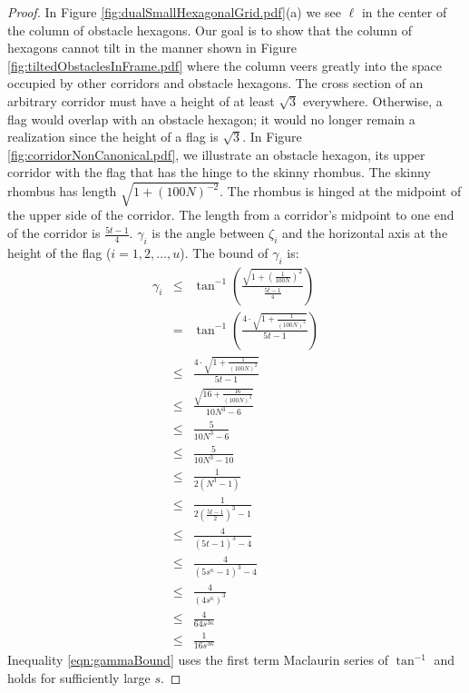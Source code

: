 \documentclass[10pt]{CSUNthesis}
\theoremstyle{plain}%
\theoremstyle{definition}
\theoremstyle{remark}
\newcommand{\lr}[1]{\left( #1 \right)}
\begin{document}
\begin{proof}
In Figure \ref{fig:dualSmallHexagonalGrid.pdf}(a) we see $\ell$ in the center of the column of obstacle hexagons.  
Our goal is to show that the column of hexagons cannot tilt in the manner shown in Figure \ref{fig:tiltedObstaclesInFrame.pdf} where the column veers greatly into the space occupied by other corridors and obstacle hexagons.
The cross section of an arbitrary corridor must have a height of at least $\sqrt{3}$ everywhere. 
Otherwise, a flag would overlap with an obstacle hexagon; it would no longer remain a realization since the height of a flag is $\sqrt{3}$.
In Figure \ref{fig:corridorNonCanonical.pdf}, we illustrate an obstacle hexagon, its upper corridor with the flag that has the hinge to the skinny rhombus.  
The skinny rhombus has length $\sqrt{1 + \lr{100N}^{-2}}$.
The rhombus is hinged at the midpoint of the upper side of the corridor.
The length from a corridor's midpoint to one end of the corridor is $\frac{5t-1}{4}$.
$\gamma_i$ is the angle between $\zeta_i$ and the horizontal axis at the height of the flag ($i = 1,2,\ldots, u$).
The bound of $\gamma_i$ is:
\begin{equation}\label{eqn:gammaBound}
\begin{array}{rcl}
\gamma_i &\leq & \tan^{-1} \lr{
								\frac{
										\sqrt{1+ \lr{	\frac{1}{100N}	}^2}
								}{
										\frac{5t-1}{4}
								}	
							}\\
&=& \tan^{-1} \lr{\frac{4\cdot \sqrt{1 + \frac{1}{(100N)^2}}}{5t-1}}\\
&\leq& \frac{4\cdot \sqrt{1 + \frac{1}{(100N)^2}}}{5t-1}\\
&\leq& \frac{\sqrt{16 + \frac{16}{(100N)^2}}}{10N^3 -6}\\
&\leq& \frac{5}{10N^3 -6}\\
&\leq& \frac{5}{10N^3 - 10}\\
&\leq& \frac{1}{2\lr{N^3 - 1}}\\
&\leq& \frac{1}{2 \lr{\frac{5t-1}{2}}^3 - 1}\\
&\leq& \frac{4}{\lr{5t-1}^3-4}\\
&\leq& \frac{4}{\lr{5s^\kappa-1}^3-4}\\
&\leq& \frac{4}{\lr{4s^\kappa}^3}\\
&\leq& \frac{4}{64s^{3\kappa}}\\
&\leq& \frac{1}{16s^{3\kappa}}
\end{array} 
\end{equation}
Inequality \ref{eqn:gammaBound} uses the first term Maclaurin series of $\tan^{-1}$ and holds for sufficiently large $s$.

\end{proof}
\end{document}
